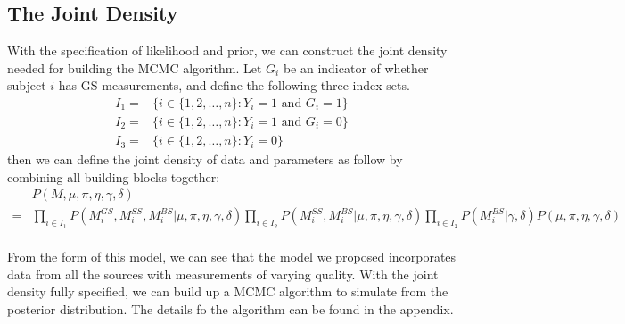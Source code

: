 \documentclass[11 pt, a4paper]{article}  %
\begin{document}
\subsection{The Joint Density}
With the specification of likelihood and prior, we can construct the joint density needed for building the MCMC algorithm. Let $G_i$ be an indicator of whether subject $i$ has GS measurements, and define the following three index sets.
\begin{align*}
I_1 = & \Big \{i \in \{1,2,\ldots, n\}: Y_i=1 \text{ and } G_i=1 \Big\}\\
I_2 = & \Big \{i \in \{1,2,\ldots, n\}: Y_i=1 \text{ and } G_i=0 \Big\}\\
I_3 = & \Big \{i \in \{1,2,\ldots, n\}: Y_i=0 \Big\}
\end{align*}
then we can define the joint density of data and parameters as follow by combining all building blocks together:
\begin{align*}
& P(M,\mu,\pi, \eta, \gamma, \delta) \\
= & \prod_{i\in I_1} P(M_i^{GS},M_i^{SS},M_i^{BS} | \mu, \pi, \eta, \gamma, \delta) 
\prod_{i\in I_2} P(M_i^{SS},M_i^{BS} | \mu, \pi, \eta, \gamma, \delta)
\prod_{i\in I_3} P(M_i^{BS} |\gamma, \delta) P(\mu, \pi, \eta, \gamma, \delta)
\end{align*}
\\
From the form of this model, we can see that the model we proposed incorporates data from all the sources with measurements of varying quality. With the joint density fully specified, we can build up a MCMC algorithm to simulate from the posterior distribution. The details fo the algorithm can be found in the appendix.
\end{document}
